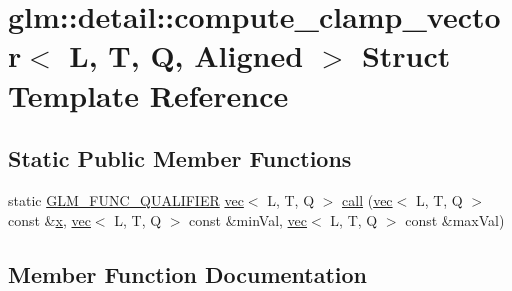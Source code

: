 \hypertarget{structglm_1_1detail_1_1compute__clamp__vector}{}\section{glm\+:\+:detail\+:\+:compute\+\_\+clamp\+\_\+vector$<$ L, T, Q, Aligned $>$ Struct Template Reference}
\label{structglm_1_1detail_1_1compute__clamp__vector}
\subsection*{Static Public Member Functions}
\begin{DoxyCompactItemize}
\item 
static \mbox{\hyperlink{setup_8hpp_a33fdea6f91c5f834105f7415e2a64407}{G\+L\+M\+\_\+\+F\+U\+N\+C\+\_\+\+Q\+U\+A\+L\+I\+F\+I\+ER}} \mbox{\hyperlink{structglm_1_1vec}{vec}}$<$ L, T, Q $>$ \mbox{\hyperlink{structglm_1_1detail_1_1compute__clamp__vector_a19b42e5fd410e11d2318498e84658562}{call}} (\mbox{\hyperlink{structglm_1_1vec}{vec}}$<$ L, T, Q $>$ const \&\mbox{\hyperlink{_s_d_l__opengl_8h_ad0e63d0edcdbd3d79554076bf309fd47}{x}}, \mbox{\hyperlink{structglm_1_1vec}{vec}}$<$ L, T, Q $>$ const \&min\+Val, \mbox{\hyperlink{structglm_1_1vec}{vec}}$<$ L, T, Q $>$ const \&max\+Val)
\end{DoxyCompactItemize}


\subsection{Member Function Documentation}
\mbox{\label{structglm_1_1detail_1_1compute__clamp__vector_a19b42e5fd410e11d2318498e84658562}} 
